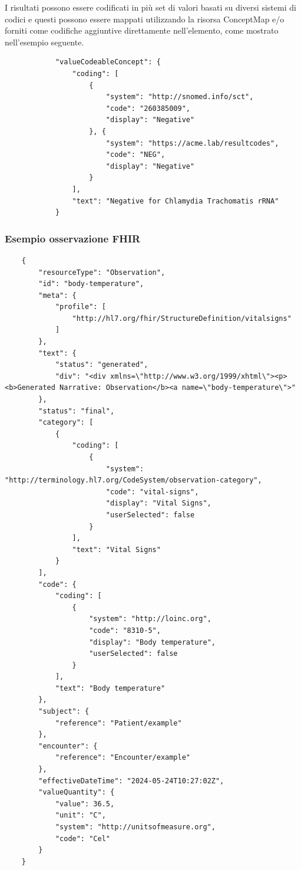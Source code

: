 \documentclass[a4paper]{article}
\begin{document}
I risultati possono essere codificati in più set di valori basati su diversi sistemi di codici e questi possono essere mappati utilizzando la risorsa ConceptMap e/o forniti come codifiche aggiuntive direttamente nell'elemento, come mostrato nell'esempio seguente.
\begin{lstlisting}
            "valueCodeableConcept": {
                "coding": [
                    {
                        "system": "http://snomed.info/sct",
                        "code": "260385009",
                        "display": "Negative"
                    }, {
                        "system": "https://acme.lab/resultcodes",
                        "code": "NEG",
                        "display": "Negative"
                    }
                ],
                "text": "Negative for Chlamydia Trachomatis rRNA"
            }
        \end{lstlisting}
\subsubsection{Esempio osservazione FHIR}
\begin{lstlisting}
    {
        "resourceType": "Observation",
        "id": "body-temperature",
        "meta": {
            "profile": [
                "http://hl7.org/fhir/StructureDefinition/vitalsigns"
            ]
        },
        "text": {
            "status": "generated",
            "div": "<div xmlns=\"http://www.w3.org/1999/xhtml\"><p><b>Generated Narrative: Observation</b><a name=\"body-temperature\">"
        },
        "status": "final",
        "category": [
            {
                "coding": [
                    {
                        "system": "http://terminology.hl7.org/CodeSystem/observation-category",
                        "code": "vital-signs",
                        "display": "Vital Signs",
                        "userSelected": false
                    }
                ],
                "text": "Vital Signs"
            }
        ],
        "code": {
            "coding": [
                {
                    "system": "http://loinc.org",
                    "code": "8310-5",
                    "display": "Body temperature",
                    "userSelected": false
                }
            ],
            "text": "Body temperature"
        },
        "subject": {
            "reference": "Patient/example"
        },
        "encounter": {
            "reference": "Encounter/example"
        },
        "effectiveDateTime": "2024-05-24T10:27:02Z",
        "valueQuantity": {
            "value": 36.5,
            "unit": "C",
            "system": "http://unitsofmeasure.org",
            "code": "Cel"
        }
    }  

\end{lstlisting}
\end{document}
